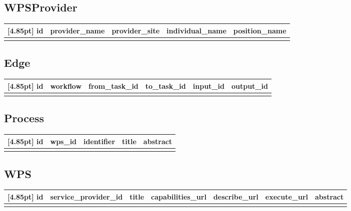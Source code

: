 		\subsection{WPSProvider}
 		\begin{center}
 			\setlength\tabcolsep{5pt}
 			\renewcommand{\arraystretch}{1.5}
 			\setcounter{ids}{0}			
 			\begin{tabular}{|c|c|c|c|c|}
 				\hline
 				\rowcolor[gray]{0.75}[4.85pt]
 				id & provider\_name & provider\_site & individual\_name & position\_name \\ \hline  
 				&&&& \\	
 				\hline
 			\end{tabular}
 		\end{center}		


		\subsection{Edge}
		\begin{center}
			\setlength\tabcolsep{5pt}
			\renewcommand{\arraystretch}{1.5}
			\setcounter{ids}{0}			
			\begin{tabular}{|c|c|c|c|c|c|}
				\hline
				\rowcolor[gray]{0.75}[4.85pt]
				id & workflow & from\_task\_id & to\_task\_id & input\_id & output\_id \\ \hline
				&&&&& \\	
				\hline
			\end{tabular}
		\end{center}		
		
		\subsection{Process}
		\begin{center}
			\setlength\tabcolsep{5pt}
			\renewcommand{\arraystretch}{1.5}
			\setcounter{ids}{0}			
			\begin{tabular}{|c|c|c|c|c|}
				\hline
				\rowcolor[gray]{0.75}[4.85pt]
				id & wps\_id & identifier & title & abstract \\ \hline  
				&&&& \\	
				\hline
			\end{tabular}
		\end{center}		
		

		\subsection{WPS}   
		\begin{center}
			\setlength\tabcolsep{5pt}
			\renewcommand{\arraystretch}{1.5}
			\setcounter{ids}{0}			
			\begin{tabular}{|c|c|c|c|c|c|c|}
				\hline
				\rowcolor[gray]{0.75}[4.85pt]
				id & service\_provider\_id & title & capabilities\_url & describe\_url & execute\_url & abstract \\ \hline
				&&&&&& \\
				\hline
			\end{tabular}
		\end{center}

